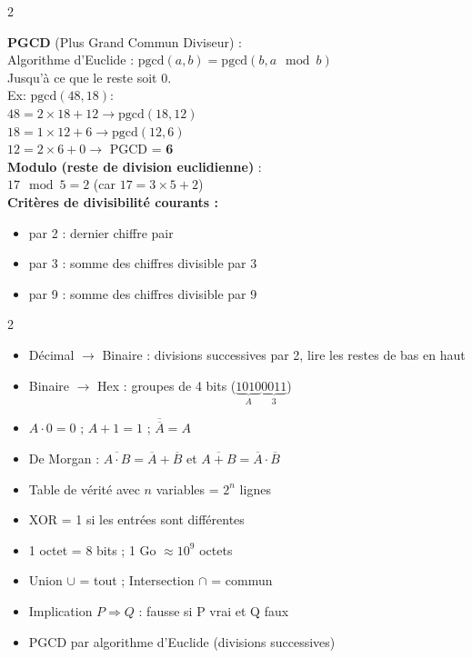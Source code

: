 \documentclass[a4paper,10pt]{article}
\begin{document}
\begin{multicols}{2}
\begin{tcolorbox}[basebox, colframe=orange, title=10. Arithmétique — PGCD et arithmétique modulo]
\textbf{PGCD} (Plus Grand Commun Diviseur) :\\
Algorithme d'Euclide : $\text{pgcd}(a, b) = \text{pgcd}(b, a \mod b)$\\
Jusqu'à ce que le reste soit 0.\\
Ex: $\text{pgcd}(48, 18)$:\\
$48 = 2 \times 18 + 12 \to \text{pgcd}(18, 12)$\\
$18 = 1 \times 12 + 6 \to \text{pgcd}(12, 6)$\\
$12 = 2 \times 6 + 0 \to$ PGCD = \textbf{6}\\[4pt]
\textbf{Modulo (reste de division euclidienne)} :\\
$17 \mod 5 = 2$ (car $17 = 3 \times 5 + 2$)\\[4pt]
\textbf{Critères de divisibilité courants :}
\begin{itemize}
  \item par 2 : dernier chiffre pair
  \item par 3 : somme des chiffres divisible par 3
  \item par 9 : somme des chiffres divisible par 9
\end{itemize}
\end{tcolorbox}

\end{multicols}

\vspace{4pt}
\begin{tcolorbox}[basebox, colframe=purple, title=Points clés à retenir pour l'examen]
\begin{multicols}{2}
\begin{itemize}
  \item Décimal $\to$ Binaire : divisions successives par 2, lire les restes de bas en haut
  \item Binaire $\to$ Hex : groupes de 4 bits ($\underbrace{1010}_{A}\underbrace{0011}_{3}$)
  \item $A \cdot 0 = 0$ ; $A + 1 = 1$ ; $\overline{\overline{A}} = A$
  \item De Morgan : $\overline{A \cdot B} = \overline{A} + \overline{B}$ et $\overline{A + B} = \overline{A} \cdot \overline{B}$
  \item Table de vérité avec $n$ variables = $2^n$ lignes
  \item XOR = 1 si les entrées sont différentes
  \item 1 octet = 8 bits ; 1 Go $\approx 10^9$ octets
  \item Union $\cup$ = tout ; Intersection $\cap$ = commun
  \item Implication $P \Rightarrow Q$ : fausse si P vrai et Q faux
  \item PGCD par algorithme d'Euclide (divisions successives)
\end{itemize}
\end{multicols}
\end{tcolorbox}
\end{document}

